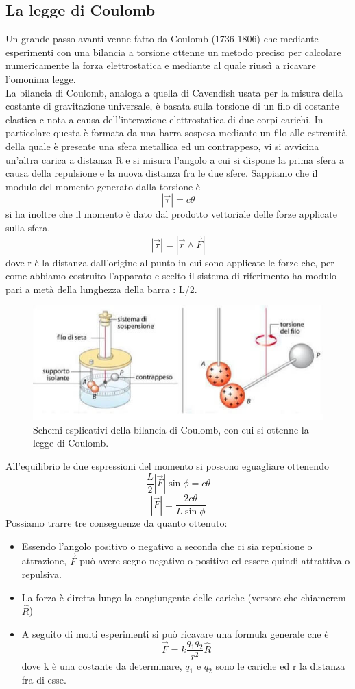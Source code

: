 \documentclass[10pt,a4paper]{article}
\begin{document}
\subsection{La legge di Coulomb}
Un grande passo avanti venne fatto da Coulomb (1736-1806) che mediante esperimenti con una bilancia a torsione ottenne un metodo preciso per calcolare numericamente la forza elettrostatica e mediante al quale riuscì a ricavare l'omonima legge.\\
La bilancia di Coulomb, analoga a quella di Cavendish usata per la misura della costante di gravitazione universale, è basata sulla torsione di un filo di costante elastica c nota a causa dell'interazione elettrostatica di due corpi carichi. In particolare questa è formata da una barra sospesa mediante un filo alle estremità della quale è presente una sfera metallica ed un contrappeso, vi si avvicina un'altra carica a distanza R e si misura l'angolo a cui si dispone la prima sfera a causa della repulsione e la nuova distanza fra le due sfere. Sappiamo che il modulo del momento generato dalla torsione è
\[|\vec{\tau}| = c\theta\]
si ha inoltre che il momento è dato dal prodotto vettoriale delle forze applicate sulla sfera.
\[|\vec{\tau}| = |\vec{r}\wedge \vec{F}|\]
dove r è la distanza dall'origine al punto in cui sono applicate le forze che, per come abbiamo costruito l'apparato e scelto il sistema di riferimento ha modulo pari a metà della lunghezza della barra : L/2. 
\begin{figure}[h!]
	\centering
	\includegraphics[width=0.6\linewidth]{images/bilancia_coulomb}
	\caption{Schemi esplicativi della bilancia di Coulomb, con cui si ottenne la legge di Coulomb.}
	\label{fig:bilanciacoulomb}
\end{figure}
\FloatBarrier
All'equilibrio le due espressioni del momento si possono eguagliare ottenendo 
\[\frac{L}{2}|\vec{F}|\sin\phi = c\theta\]
\[|\vec{F}| = \frac{2c\theta}{L\sin\phi}\] 
Possiamo trarre tre conseguenze da quanto ottenuto:
\begin{itemize}
	\item Essendo l'angolo positivo o negativo a seconda che ci sia repulsione o attrazione, $\vec{F}$ può avere segno negativo o positivo ed essere quindi attrattiva o repulsiva. 
	\item La forza è diretta lungo la congiungente delle cariche (versore che chiamerem $\hat{R}$)
	\item A seguito di molti esperimenti si può ricavare una formula generale che è 
	\[\vec{F} = k \frac{q_1q_2}{r^2}\hat{R}\]
	dove k è una costante da determinare, \(q_1\) e \(q_2\) sono le cariche ed r la distanza fra di esse. 
\end{itemize}
\end{document}
